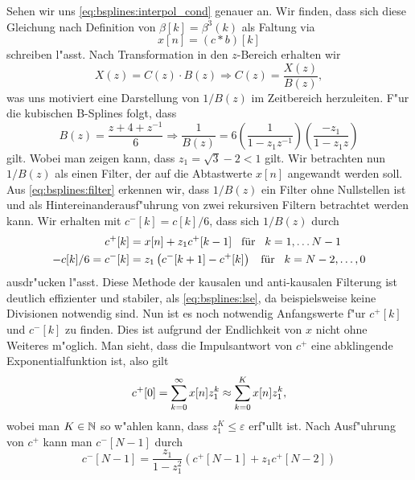 Sehen wir uns \eqref{eq:bsplines:interpol_cond} genauer an. 
Wir finden, dass sich diese Gleichung nach Definition von $\beta[k] = \beta^3(k)$ als Faltung via
\begin{equation}\label{eq:bsplines:conv}
    x[n] = (c \ast b)[k]
\end{equation}
schreiben l"asst. 
Nach Transformation in den $z$-Bereich erhalten wir
\begin{equation}\label{eq:bsplines:ztrafo}
    X(z) = C(z) \cdot B(z) \Rightarrow C(z) = \frac{X(z)}{B(z)},
\end{equation}
was uns motiviert eine Darstellung von $1/B(z)$ im Zeitbereich herzuleiten. 
F"ur die kubischen B-Splines folgt, dass
\begin{equation}\label{eq:bsplines:filter}
    B(z) = \frac{z + 4 + z^{-1}}{6} 
    \Rightarrow \frac{1}{B(z)} 
        = 6 \left(\frac{1}{1 - z_1 z^{-1}}\right) \left(\frac{-z_1}{1 - z_1 z}\right)
\end{equation}
gilt. 
Wobei man zeigen kann, dass $z_1 = \sqrt{3} - 2 < 1$ gilt. 
Wir betrachten nun $1/B(z)$ als einen Filter, der auf die Abtastwerte $x[n]$ angewandt werden soll. 
Aus \eqref{eq:bsplines:filter} erkennen wir, dass $1/B(z)$ ein Filter ohne Nullstellen ist und als Hintereinanderausf"uhrung von zwei rekursiven Filtern betrachtet werden kann. 
Wir erhalten mit $c^{-}[k] = c[k]/6$, dass sich $1/B(z)$ durch
\begin{align}
    c^+[k] &= 
        x[n] + z_1 c^+[k-1] {\hspace{3mm} \text{f\"ur} \hspace{3mm}} k = 1, \dots N-1 \\
    -c[k]/6 = c^-[k] &= 
        z_1\left( c^{-}[k+1] - c^+[k]\right) {\hspace{3mm} \text{f\"ur} \hspace{3mm}} k = N-2, \dots, 0
\end{align}
ausdr"ucken l"asst. 
Diese Methode der kausalen und anti-kausalen Filterung ist deutlich effizienter und stabiler, als \eqref{eq:bsplines:lse}, da beispielsweise keine Divisionen notwendig sind. 
Nun ist es noch notwendig Anfangswerte f"ur $c^+[k]$ und $c^-[k]$ zu finden. 
Dies ist aufgrund der Endlichkeit von $x$ nicht ohne Weiteres m"oglich. 
Man sieht, dass die Impulsantwort von $c^+$ eine abklingende Exponentialfunktion ist, also gilt
\begin{equation}
    c^+[0] = {\sum\limits_{k=0}^{\infty}{x[n] z_1^k}} \approx {\sum\limits_{k=0}^{K}{x[n] z_1^k}},
\end{equation}
wobei man $K \in \mathbb{N}$ so w"ahlen kann, dass $z_1^K \leqslant \varepsilon$ erf"ullt ist.
Nach Ausf"uhrung von $c^+$ kann man $c^-[N-1]$ durch
\begin{equation}
    c^-[N-1] = \frac{z_1}{1 - z_1^2}\left(c^+[N-1] + z_1 c^+[N-2]\right)
\end{equation}
